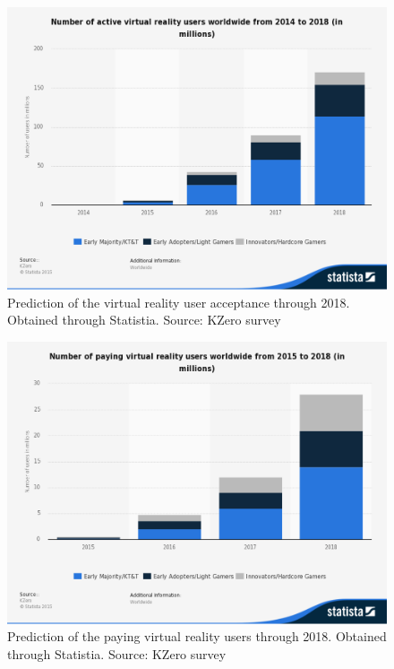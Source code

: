 \documentclass[a4paper,10pt]{article}
\begin{document}
\begin{figure}[H]
	\centerline{\includegraphics[scale = 0.3]{statsUsers.png}}
	\caption{Prediction of the virtual reality user acceptance through 2018.  Obtained through Statistia.  Source: KZero survey \cite{vrUser}}
	\label{fig:userStats}
\end{figure}

\begin{figure}[H]
	\centerline{\includegraphics[scale = 0.3]{statPay.png}}
	\caption{Prediction of the paying virtual reality users through 2018.  Obtained through Statistia.  Source: KZero survey \cite{payUser}}
	\label{fig:moneyStats2}
\end{figure}
\end{document}
